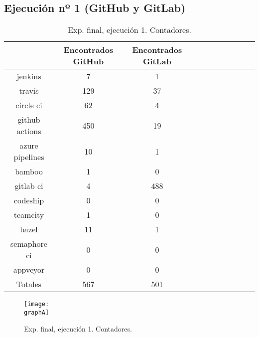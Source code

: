 \subsection{Ejecución nº 1 (GitHub y GitLab)}

\begin{table}
  \centering
  \caption{Exp. final, ejecución 1. Contadores.}
  \label{tab:tabla_f1_1}

\begin{footnotesize}
\renewcommand{\arraystretch}{1.5} %
\begin{tabular}{ccccccccccc}
  \hline
  {} &  Encontrados GitHub &  Encontrados GitLab \\
  \hline
  jenkins         &                   7 &                   1 \\
  travis          &                 129 &                  37 \\
  circle ci       &                  62 &                   4 \\
  github actions  &                 450 &                  19 \\
  azure pipelines &                  10 &                   1 \\
  bamboo          &                   1 &                   0 \\
  gitlab ci       &                   4 &                 488 \\
  codeship        &                   0 &                   0 \\
  teamcity        &                   1 &                   0 \\
  bazel           &                  11 &                   1 \\
  semaphore ci    &                   0 &                   0 \\
  appveyor        &                   0 &                   0 \\
  \hline
  Totales         &                 567 &                 501 \\
 \end{tabular}
\end{footnotesize}

\end{table}

\begin{figure}
  \centering
  \texttt{[image: \\graphA]}
  \caption{Exp. final, ejecución 1. Contadores.}
\end{figure}

